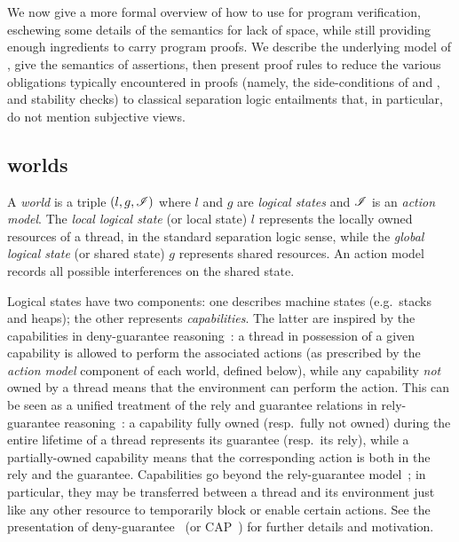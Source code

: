 \section{\colosl}\label{sec:colosl}
We now give a more formal overview of how to use \colosl for program
verification, eschewing some details of the semantics for lack of
space, while still providing enough ingredients to carry program
proofs. We describe the underlying model of \colosl, give the
semantics of \colosl assertions, then present proof rules to reduce
the various obligations typically encountered in proofs (namely, the
side-conditions of \shiftRule and \extendRule, and stability checks)
to classical separation logic entailments that, in
particular, do not mention subjective views.


\subsection{\colosl worlds}
\label{subsec:model}

A \emph{world} is a triple $(l, g, \mathscr{I})$ where $l$ and $g$ are
\emph{logical states} and $\mathscr{I}$ is an \emph{action model}. The
\emph{local logical state} (or local state) $l$ represents the
locally owned resources of a thread, in the standard separation logic
sense, while the \emph{global logical state} (or shared state)
$g$ represents shared resources. An action model records all possible interferences on the shared state.

Logical states have two components: one describes machine states
(e.g.\ stacks and heaps); the other represents
\emph{capabilities}. The latter are inspired by the capabilities in
deny-guarantee reasoning~\cite{dg}: a thread in possession of a given
capability is allowed to perform the associated actions (as prescribed
by the \emph{action model} component of each world, defined below),
while any capability \emph{not} owned by a thread means that the
environment can perform the action. This can be seen as a unified
treatment of the rely and guarantee relations in rely-guarantee
reasoning~\cite{rg}: a capability fully owned (resp.\ fully not owned)
during the entire lifetime of a thread represents its guarantee
(resp.\ its rely), while a partially-owned capability means that the
corresponding action is both in the rely and the
guarantee. Capabilities go beyond the rely-guarantee model~\cite{dg};
in particular, they may be transferred between a thread and its
environment just like any other resource to temporarily block or enable certain actions. See the presentation of
deny-guarantee~\cite{dg} (or CAP~\cite{cap-ecoop10}) for further details
and motivation.

